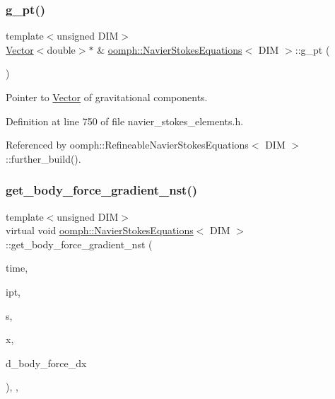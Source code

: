 \subsubsection{\texorpdfstring{g\+\_\+pt()}{g\_pt()}}
{\footnotesize\ttfamily template$<$unsigned D\+IM$>$ \\
\hyperlink{classoomph_1_1Vector}{Vector}$<$double$>$$\ast$ \& \hyperlink{classoomph_1_1NavierStokesEquations}{oomph\+::\+Navier\+Stokes\+Equations}$<$ D\+IM $>$\+::g\+\_\+pt (\begin{DoxyParamCaption}{ }\end{DoxyParamCaption})\hspace{0.3cm}{\ttfamily [inline]}}



Pointer to \hyperlink{classoomph_1_1Vector}{Vector} of gravitational components. 



Definition at line 750 of file navier\+\_\+stokes\+\_\+elements.\+h.



Referenced by oomph\+::\+Refineable\+Navier\+Stokes\+Equations$<$ D\+I\+M $>$\+::further\+\_\+build().

\mbox{\label{classoomph_1_1NavierStokesEquations_a902533453645818bfd1250f532b1005a}} 
\subsubsection{\texorpdfstring{get\+\_\+body\+\_\+force\+\_\+gradient\+\_\+nst()}{get\_body\_force\_gradient\_nst()}}
{\footnotesize\ttfamily template$<$unsigned D\+IM$>$ \\
virtual void \hyperlink{classoomph_1_1NavierStokesEquations}{oomph\+::\+Navier\+Stokes\+Equations}$<$ D\+IM $>$\+::get\+\_\+body\+\_\+force\+\_\+gradient\+\_\+nst (\begin{DoxyParamCaption}\item[{const double \&}]{time,  }\item[{const unsigned \&}]{ipt,  }\item[{const \hyperlink{classoomph_1_1Vector}{Vector}$<$ double $>$ \&}]{s,  }\item[{const \hyperlink{classoomph_1_1Vector}{Vector}$<$ double $>$ \&}]{x,  }\item[{\hyperlink{classoomph_1_1DenseMatrix}{Dense\+Matrix}$<$ double $>$ \&}]{d\+\_\+body\+\_\+force\+\_\+dx }\end{DoxyParamCaption})\hspace{0.3cm}{\ttfamily [inline]}, {\ttfamily [protected]}, {\ttfamily [virtual]}}

